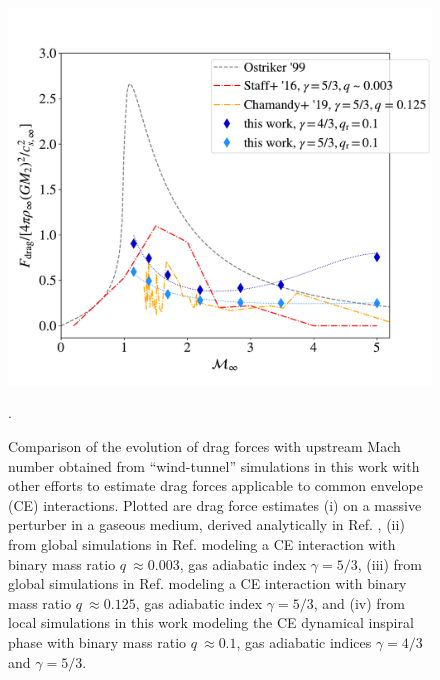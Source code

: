 \begin{figure}
 \centering
 \includegraphics[width=13cm]{figures/common_envelope/Cd_ostriker_staff_chamandy_compare_ostriker_fig3units.pdf}\caption{Comparison of the evolution of drag forces with upstream Mach number obtained from ``wind-tunnel'' simulations in this work with other efforts to estimate drag forces applicable to common envelope (CE) interactions. Plotted are drag force estimates (i) on a massive perturber in a gaseous medium, derived analytically in Ref. \cite{1999ApJ...513..252O}, (ii) from global simulations in Ref. \cite{Staff:2016} modeling a CE interaction with binary mass ratio $q~\approx 0.003$, gas adiabatic index $\gamma = 5/3$, (iii) from global simulations in Ref. \cite{Chamandy:2019psk} modeling a CE interaction with binary mass ratio $q~\approx 0.125$, gas adiabatic index $\gamma = 5/3$, and (iv) from local simulations in this work modeling the CE dynamical inspiral phase with binary mass ratio $q~\approx 0.1$, gas adiabatic indices $\gamma = 4/3$ and $\gamma = 5/3$. \label{fig:drag_compare}}.
\end{figure}